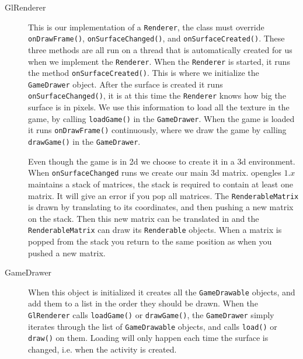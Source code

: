 \begin{description}

\item[GlRenderer] This is our implementation of a \lstinline|Renderer|, the class must override \linebreak \lstinline|onDrawFrame()|, \lstinline|onSurfaceChanged()|, and \lstinline|onSurfaceCreated()|. These three methods are all run on a thread that is automatically created for us when we implement the \lstinline|Renderer|. When the \lstinline|Renderer| is started, it runs the method \linebreak \lstinline|onSurfaceCreated()|. This is where we initialize the \lstinline|GameDrawer| object. After the surface is created it runs \lstinline|onSurfaceChanged()|, it is at this time the \lstinline|Renderer| knows how big the surface is in pixels. We use this information to load all the texture in the game, by calling \lstinline|loadGame()| in the \lstinline|GameDrawer|. When the game is loaded it runs \lstinline|onDrawFrame()| continuously, where we draw the game by calling \lstinline|drawGame()| in the \lstinline|GameDrawer|.

Even though the game is in \ac{2d} we choose to create it in a \ac{3d} environment. When \lstinline|onSurfaceChanged| runs we create our main \ac{3d} matrix. \ac{opengles} $1.x$ maintains a stack of matrices, the stack is required to contain at least one matrix. It will give an error if you pop all matrices. The \lstinline|RenderableMatrix| is drawn by translating to its coordinates, and then pushing a new matrix on the stack. Then this new matrix can be translated in and the \lstinline|RenderableMatrix| can draw its \lstinline|Renderable| objects. When a matrix is popped from the stack you return to the same position as when you pushed a new matrix.\citep{openglspecs}

\item[GameDrawer] When this object is initialized it creates all the \lstinline|GameDrawable| objects, and add them to a list in the order they should be drawn. When the \lstinline|GlRenderer| calls \lstinline|loadGame()| or \lstinline|drawGame()|, the \lstinline|GameDrawer| simply iterates through the list of \lstinline|GameDrawable| objects, and calls \lstinline|load()| or \lstinline|draw()| on them. Loading will only happen each time the surface is changed, i.e. when the activity is created.


\end{description}

